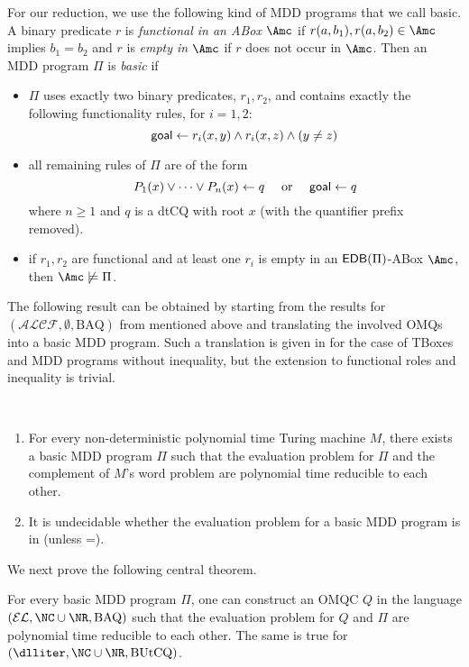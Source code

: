\documentclass{lmcs}
\theoremstyle{definition}
\begin{document}
For our reduction, we use the following kind of MDD programs that we
call basic. A binary predicate $r$ is \emph{functional in an ABox}
$\Amc$ if $r(a,b_{1}),r(a,b_{2})\in \Amc$ implies $b_{1}=b_{2}$ and
$r$ is \emph{empty in} $\Amc$ if $r$ does not occur in $\Amc$. Then an
MDD program $\Pi$ is \emph{basic} if
\begin{itemize}
\item $\Pi$ uses exactly two binary predicates, $r_{1},r_{2}$, and
  contains exactly the following functionality rules, for $i=1,2$:
$$
{\sf goal} \leftarrow r_{i}(x,y) \wedge r_{i}(x,z) \wedge (y\not=z) 
$$
\item all remaining rules of $\Pi$ are of the form
$$
P_{1}(x)\vee \cdots \vee P_{n}(x) \leftarrow q \quad \mbox{ or } \quad {\sf goal}\leftarrow q
$$
where $n\geq 1$ and $q$ is a dtCQ with root $x$ (with the quantifier prefix removed).
\item if $r_{1},r_{2}$ are functional and at least one $r_{i}$ is empty in an ${\sf EDB}(\Pi)$-ABox $\Amc$, then $\Amc\not\models\Pi$.
\end{itemize}
The following result can be obtained by starting from the results for
$(\mathcal{ALCF},\emptyset,\text{BAQ})$ from
\cite{DBLP:journals/lmcs/LutzW17,DBLP:journals/tods/BienvenuCLW14}
mentioned above and translating the involved OMQs into a basic MDD
program. Such a translation is given in
\cite{DBLP:journals/tods/BienvenuCLW14} for the case of \ALC TBoxes
and MDD programs without inequality, but the extension to functional
roles and inequality is trivial.
%
\begin{thm}\label{thm:mdd}~\\[-4mm]
\begin{enumerate}
\item For every non-deterministic polynomial time Turing machine $M$, there exists a basic MDD program $\Pi$ such that the
evaluation problem for $\Pi$ and the complement of $M$'s word problem are polynomial time reducible to each other.
\item It is undecidable whether the evaluation problem for a basic MDD program is in \ptime (unless \ptime=\np).
\end{enumerate}
\end{thm}
We next prove the following central theorem.
\begin{thm}
  \label{thm:tmequi}
  For every basic MDD program $\Pi$, one can construct an
  OMQC $Q$ in the language $(\mathcal{EL},\NC\cup\NR,\text{BAQ})$ such that the evaluation problem for $Q$
  and $\Pi$ are polynomial time reducible to each other. The same is true for $(\dlliter,\NC\cup \NR,\text{BUtCQ})$.
\end{thm}
\end{document}
